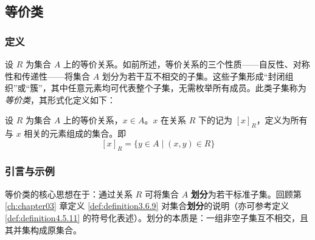 
\subsection{等价类}

\subsubsection*{定义}

设 $R$ 为集合 $A$ 上的等价关系。如前所述，等价关系的三个性质——自反性、对称性和传递性——将集合 $A$ 划分为若干互不相交的子集。这些子集形成``封闭组织''或``簇''，其中任意元素均可代表整个子集，无需枚举所有成员。此类子集称为\emph{等价类}，其形式化定义如下：

\begin{definition}
    设 $R$ 为集合 $A$ 上的等价关系，$x \in A$。$x$ 在关系 $R$ 下的记为 $[x]_R$，定义为所有与 $x$ 相关的元素组成的集合。即
    \[[x]_R = \{y \in A \mid (x,y) \in R\}\]
\end{definition}

\subsubsection*{引言与示例}

等价类的核心思想在于：通过关系 $R$ 可将集合 $A$ \textbf{划分}为若干标准子集。回顾第 \ref{ch:chapter03} 章定义 \ref{def:definition3.6.9} 对集合\textbf{划分}的说明（亦可参考定义 \ref{def:definition4.5.11} 的符号化表述）。划分的本质是：一组非空子集互不相交，且其并集构成原集合。

